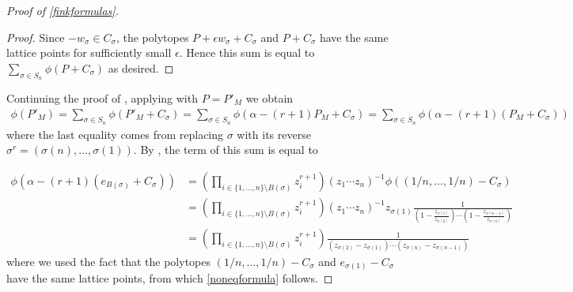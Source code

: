 \documentclass[12pt]{amsart}
\newcommand{\mc}{\mathcal}
\newcommand{\Vt}{{\operatorname{Vert}}}
\theoremstyle{plain}
\theoremstyle{definition}
\theoremstyle{remark}
\begin{document}
\begin{proof}[Proof of \cref{finkformulas}]
\begin{proof}
Since $- w_\sigma \in C_\sigma$, the polytopes $P + \epsilon w_\sigma + C_\sigma$ and $P + C_\sigma$ have the same lattice points for sufficiently small $\epsilon$. Hence this sum is equal to $\sum_{\sigma \in S_n} \phi(P + C_\sigma)$ as desired.
\end{proof}

Continuing the proof of , applying  with $P = P'_M$ we obtain
\begin{align*}
\phi(P'_M) = \sum_{\sigma \in S_n} \phi(P'_M + C_\sigma)
=\sum_{\sigma \in S_n} \phi(\alpha-(r+1)P_M + C_\sigma) 
= \sum_{\sigma \in S_n} \phi(\alpha-(r+1)(P_M + C_\sigma)) 
\end{align*}
where the last equality comes from replacing $\sigma$ with its reverse $\sigma^r = (\sigma(n), \ldots, \sigma(1))$. By , the term of this sum is equal to

\begin{align*}
\phi(\alpha-(r+1)(e_{B(\sigma)} + C_\sigma)) &= \left(\prod_{i \in \{1,\ldots,n\}\setminus B(\sigma)} z_i^{r+1}\right) (z_1 \cdots z_n)^{-1} \phi((1/n,\ldots,1/n) -  C_\sigma)\\
&= \left(\prod_{i \in \{1,\ldots,n\}\setminus B(\sigma)} z_i^{r+1}\right)(z_1 \cdots z_n)^{-1} z_{\sigma(1)} \frac{1}{\left(1 - \frac{z_{\sigma(1)}}{z_{\sigma(2)}}\right) \cdots \left(1 - \frac{z_{\sigma(n-1)}}{z_{\sigma(n)}}\right)} \\
&= \left(\prod_{i \in \{1,\ldots,n\}\setminus B(\sigma)} z_i^{r+1}\right)\frac{1}{(z_{\sigma(2)}-z_{\sigma(1)})\cdots (z_{\sigma(n)}-z_{\sigma(n-1)})}
\end{align*}
where we used the fact that the polytopes $(1/n,\ldots,1/n) -  C_\sigma$ and $e_{\sigma(1)} - C_\sigma$ have the same lattice points, from which \eqref{noneqformula} follows.

\end{proof}
\end{document}
